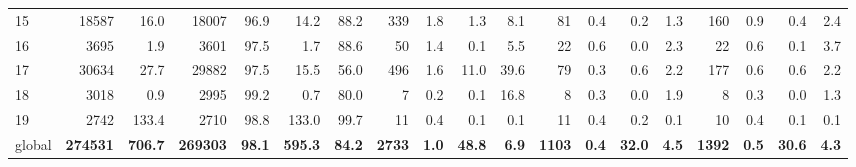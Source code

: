 \begin{tabular}{lrrrrrrrrrrrrrrrrrr}
15 & 18587 & 16.0 & 18007 & 96.9 & 14.2 & 88.2 & 339 & 1.8 & 1.3 & 8.1 & 81 & 0.4 & 0.2 & 1.3 & 160 & 0.9 & 0.4 & 2.4 \\
16 & 3695 & 1.9 & 3601 & 97.5 & 1.7 & 88.6 & 50 & 1.4 & 0.1 & 5.5 & 22 & 0.6 & 0.0 & 2.3 & 22 & 0.6 & 0.1 & 3.7 \\
17 & 30634 & 27.7 & 29882 & 97.5 & 15.5 & 56.0 & 496 & 1.6 & 11.0 & 39.6 & 79 & 0.3 & 0.6 & 2.2 & 177 & 0.6 & 0.6 & 2.2 \\
18 & 3018 & 0.9 & 2995 & 99.2 & 0.7 & 80.0 & 7 & 0.2 & 0.1 & 16.8 & 8 & 0.3 & 0.0 & 1.9 & 8 & 0.3 & 0.0 & 1.3 \\
19 & 2742 & 133.4 & 2710 & 98.8 & 133.0 & 99.7 & 11 & 0.4 & 0.1 & 0.1 & 11 & 0.4 & 0.2 & 0.1 & 10 & 0.4 & 0.1 & 0.1 \\
global & \textbf{274531} & \textbf{706.7} & \textbf{269303} & \textbf{98.1} & \textbf{595.3} & \textbf{84.2} & \textbf{2733} & \textbf{1.0} & \textbf{48.8} & \textbf{6.9} & \textbf{1103} & \textbf{0.4} & \textbf{32.0} & \textbf{4.5} & \textbf{1392} & \textbf{0.5} & \textbf{30.6} & \textbf{4.3} \\
\end{tabular}

